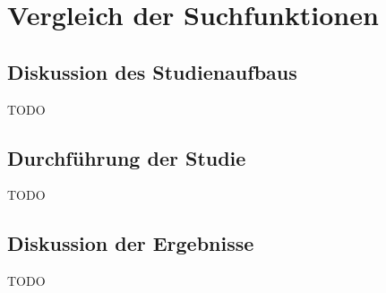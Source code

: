 \chapter{Vergleich der Suchfunktionen}



\section{Diskussion des Studienaufbaus}
TODO

\section{Durchführung der Studie}
TODO

\section{Diskussion der Ergebnisse}
TODO
